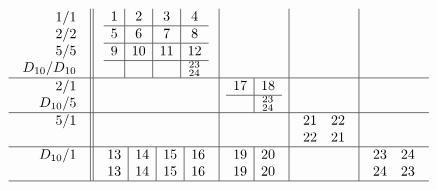 \documentclass[12pt,a4paper]{amsart}
\begin{document}
\scriptsize {}
\begin{align*}
  \begin{array}{r||c|c|c|c}
    \begin{array}{r}
      1/1 \\ 2/2 \\ 5/5 \\ D_{10}/D_{10}
    \end{array}
    &
    \begin{array}{c|c|c|c}
1&2&3&4\\\hline
5&6&7&8\\\hline
9&10&11&12\\\hline
&&&^{23}_{24}\\
    \end{array}
&&&\\\hline
    \begin{array}{r}
      2/1 \\ D_{10}/5
    \end{array}
&&
    \begin{array}{c|c}
      17&18\\\hline
      &^{23}_{24}\\
    \end{array}
&&\\\hline
    \begin{array}{r}
      5/1 \\ \\
    \end{array}
&
&
&
  \begin{array}{cc}
21&22\\
22&21\\
  \end{array}
&\\\hline
    \begin{array}{r}
      D_{10}/1 \\  \\
    \end{array}
&
    \begin{array}{c|c|c|c}
13&14&15&16\\
13&14&15&16\\
    \end{array}
&
    \begin{array}{c|c}
      19&20\\
      19&20\\
    \end{array}
&
&
  \begin{array}{cc}
23&24\\
24&23\\
  \end{array}
\\\hline
  \end{array}
\end{align*}
\end{document}
